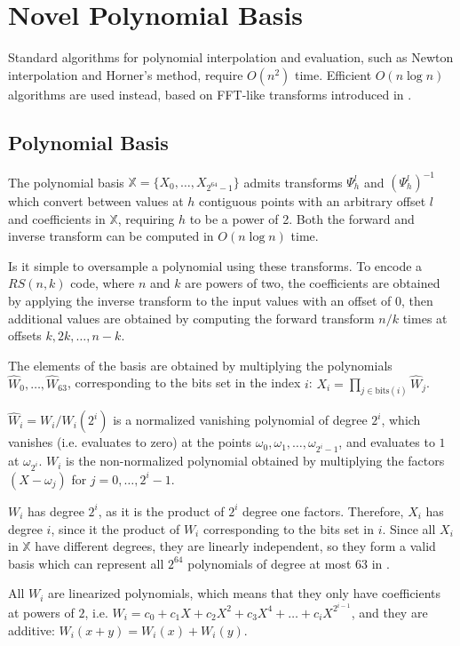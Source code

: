 \chapter{Novel Polynomial Basis}

Standard algorithms for polynomial interpolation and evaluation, such as Newton interpolation and Horner's method, require $O(n^2)$ time.
Efficient $O(n \log n)$ algorithms are used instead, based on FFT-like transforms introduced in \cite{novel-poly}.

\section{Polynomial Basis}

The polynomial basis $\mathbb{X} = \{X_0, \ldots, X_{2^{64} - 1}\}$ admits transforms $\Psi_h^l$ and $(\Psi_h^l)^{-1}$ which convert between values at $h$ contiguous points with an arbitrary offset $l$ and coefficients in $\mathbb{X}$, requiring $h$ to be a power of 2.
Both the forward and inverse transform can be computed in $O(n \log n)$ time.

Is it simple to oversample a polynomial using these transforms.
To encode a $RS(n, k)$ code, where $n$ and $k$ are powers of two, the coefficients are obtained by applying the inverse transform to the input values with an offset of $0$, then additional values are obtained by computing the forward transform $n/k$ times at offsets $k, 2k, \ldots, n - k$.

The elements of the basis are obtained by multiplying the polynomials $\hat{W}_0, \ldots, \hat{W}_{63}$, corresponding to the bits set in the index $i$: $X_i = \prod_{j \in \text{bits}(i)} \hat{W}_j$.

$\hat{W}_i = W_i / W_i(2^{i})$ is a normalized vanishing polynomial of degree $2^{i}$, which vanishes (i.e. evaluates to zero) at the points $\omega_0, \omega_1, \ldots, \omega_{2^{i} - 1}$, and evaluates to $1$ at $\omega_{2^{i}}$.
$W_i$ is the non-normalized polynomial obtained by multiplying the factors $(X - \omega_j)$ for $j = 0, \ldots, 2^{i} - 1$.

$W_i$ has degree $2^{i}$, as it is the product of $2^{i}$ degree one factors. Therefore, $X_i$ has degree $i$, since it the product of $W_i$ corresponding to the bits set in $i$.
Since all $X_i$ in $\mathbb{X}$ have different degrees, they are linearly independent, so they form a valid basis which can represent all $2^{64}$ polynomials of degree at most $63$ in .

All $W_i$ are linearized polynomials, which means that they only have coefficients at powers of $2$, i.e. $W_i = c_0 + c_1 X + c_2 X^2 + c_3 X^4 + \ldots + c_i X^{2^{i - 1}}$, and they are additive: $W_i(x + y) = W_i(x) + W_i(y)$.

